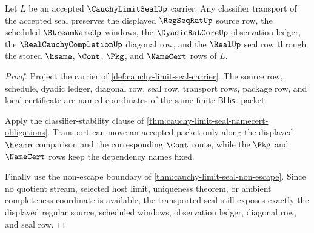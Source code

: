 \begin{theorem}
\label{thm:cauchy-limit-seal-regular-source-stability}
Let $L$ be an accepted $\CauchyLimitSealUp$ carrier. Any classifier transport of the accepted seal preserves the displayed $\RegSeqRatUp$ source row, the scheduled $\StreamNameUp$ windows, the $\DyadicRatCoreUp$ observation ledger, the $\RealCauchyCompletionUp$ diagonal row, and the $\RealUp$ seal row through the stored $\hsame$, $\Cont$, $\Pkg$, and $\NameCert$ rows of $L$.
\end{theorem}
\begin{proof}
Project the carrier of \autoref{def:cauchy-limit-seal-carrier}. The source row, schedule, dyadic ledger, diagonal row, seal row, transport rows, package row, and local certificate are named coordinates of the same finite $\mathsf{BHist}$ packet.

Apply the classifier-stability clause of \autoref{thm:cauchy-limit-seal-namecert-obligations}. Transport can move an accepted packet only along the displayed $\hsame$ comparison and the corresponding $\Cont$ route, while the $\Pkg$ and $\NameCert$ rows keep the dependency names fixed.

Finally use the non-escape boundary of \autoref{thm:cauchy-limit-seal-non-escape}. Since no quotient stream, selected host limit, uniqueness theorem, or ambient completeness coordinate is available, the transported seal still exposes exactly the displayed regular source, scheduled windows, observation ledger, diagonal row, and seal row.
\end{proof}


